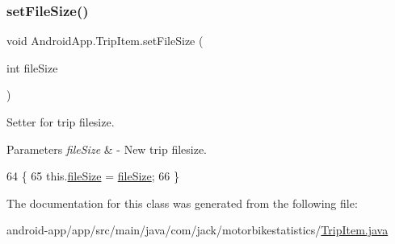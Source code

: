 \subsubsection{\texorpdfstring{set\+File\+Size()}{setFileSize()}}
{\footnotesize\ttfamily void Android\+App.\+Trip\+Item.\+set\+File\+Size (\begin{DoxyParamCaption}\item[{int}]{file\+Size }\end{DoxyParamCaption})\hspace{0.3cm}{\ttfamily [inline]}}



Setter for trip filesize. 


\begin{DoxyParams}{Parameters}
{\em file\+Size} & -\/ New trip filesize. \\
\hline
\end{DoxyParams}

\begin{DoxyCode}
64                                           \{
65         this.\hyperlink{class_android_app_1_1_trip_item_a0689a1340427784d8658cc616da310f2}{fileSize} = \hyperlink{class_android_app_1_1_trip_item_a0689a1340427784d8658cc616da310f2}{fileSize};
66     \}
\end{DoxyCode}


The documentation for this class was generated from the following file\+:\begin{DoxyCompactItemize}
\item 
android-\/app/app/src/main/java/com/jack/motorbikestatistics/\hyperlink{_trip_item_8java}{Trip\+Item.\+java}\end{DoxyCompactItemize}
